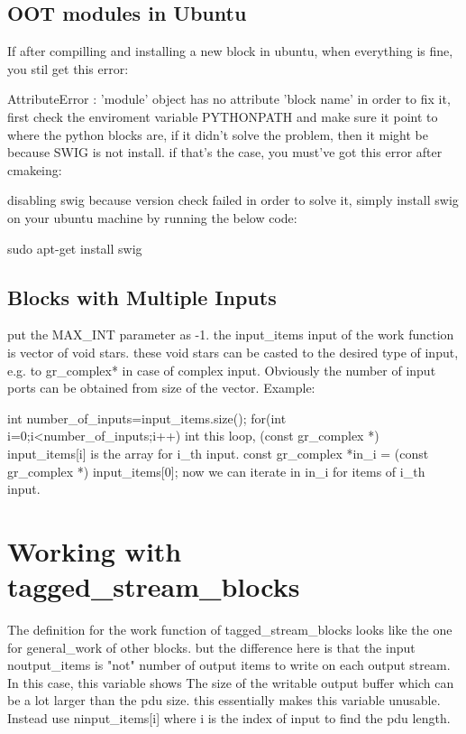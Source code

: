 \subsection{OOT modules in Ubuntu}

If after compilling and installing a new block in ubuntu, when everything is fine, you stil get this error:

AttributeError : 'module' object has no attribute 'block name'
in order to fix it, first check the enviroment variable PYTHONPATH and make sure it point to where the python blocks are, if it didn't solve the problem, then it might be because SWIG is not install. if that's the case, you must've got this error after cmakeing:

disabling swig because version check failed
in order to solve it, simply install swig on your ubuntu machine by running the below code:

sudo apt-get install swig

\subsection{Blocks with Multiple Inputs}
put the MAX_INT parameter as -1. the input_items input of the work function is vector of void stars. these void stars can be casted to the desired type of input, e.g. to gr_complex* in case of complex input. Obviously the number of input ports can be obtained from size of the vector. Example:

int number_of_inputs=input_items.size();
for(int i=0;i<number_of_inputs;i++)
{
 int this loop, (const gr_complex *) input_items[i] is the array for i_th input.
 const gr_complex *in_i = (const gr_complex *) input_items[0];
 now we can iterate in in_i for items of i_th input.
}


\section{Working with tagged_stream_blocks}

The definition for the work function of tagged_stream_blocks looks like the one for general_work of other blocks. but the difference here is that the input noutput_items is "not" number of output items to write on each output stream. In this case, this variable shows The size of the writable output buffer which can be a lot larger than the pdu size. this essentially makes this variable unusable. Instead use ninput_items[i] where i is the index of input to find the pdu length.



